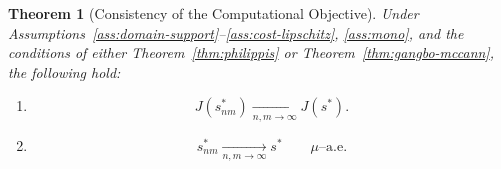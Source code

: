\documentclass[12pt,leqno]{amsart}
\newtheorem{theorem}{Theorem}
\begin{document}
\begin{theorem}[Consistency of the Computational Objective]\label{thm:consistency}
Under Assumptions~\ref{ass:domain-support}--\ref{ass:cost-lipschitz},
\ref{ass:mono}, and the conditions of either
Theorem~\ref{thm:philippis} or Theorem~\ref{thm:gangbo-mccann}, the
following hold:
\begin{enumerate}[label={\textnormal{(\roman*)}},itemindent=1em]
    \item\label{thm:consistency-obj}
    \[
    J(s_{nm}^*) \xrightarrow[n,m\to\infty]{} J(s^*).
    \]
    \item\label{thm:consistency-map}
    \[
    s_{nm}^* \xrightarrow[n,m\to\infty]{} s^*
    \qquad \mu\text{--a.e.}
    \]
\end{enumerate}
\end{theorem}
\end{document}
